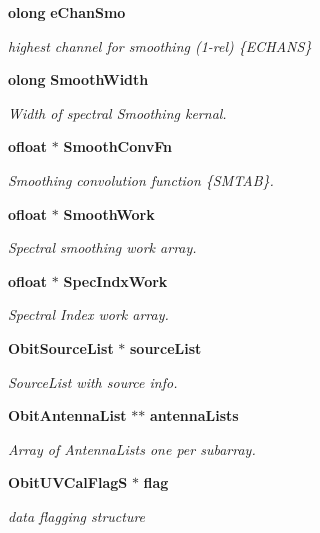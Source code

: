 \begin{CompactItemize}
{\bf olong} {\bf e\-Chan\-Smo}
\begin{CompactList}\small\item\em highest channel for smoothing (1-rel) \{ECHANS\} \item\end{CompactList}\item 
{\bf olong} {\bf Smooth\-Width}
\begin{CompactList}\small\item\em Width of spectral Smoothing kernal. \item\end{CompactList}\item 
{\bf ofloat} $\ast$ {\bf Smooth\-Conv\-Fn}
\begin{CompactList}\small\item\em Smoothing convolution function \{SMTAB\}. \item\end{CompactList}\item 
{\bf ofloat} $\ast$ {\bf Smooth\-Work}
\begin{CompactList}\small\item\em Spectral smoothing work array. \item\end{CompactList}\item 
{\bf ofloat} $\ast$ {\bf Spec\-Indx\-Work}
\begin{CompactList}\small\item\em Spectral Index work array. \item\end{CompactList}\item 
{\bf Obit\-Source\-List} $\ast$ {\bf source\-List}
\begin{CompactList}\small\item\em Source\-List with source info. \item\end{CompactList}\item 
{\bf Obit\-Antenna\-List} $\ast$$\ast$ {\bf antenna\-Lists}
\begin{CompactList}\small\item\em Array of Antenna\-Lists one per subarray. \item\end{CompactList}\item 
{\bf Obit\-UVCal\-Flag\-S} $\ast$ {\bf flag}
\begin{CompactList}\small\item\em data flagging structure \item\end{CompactList}\item 
$$
\end{CompactItemize}
